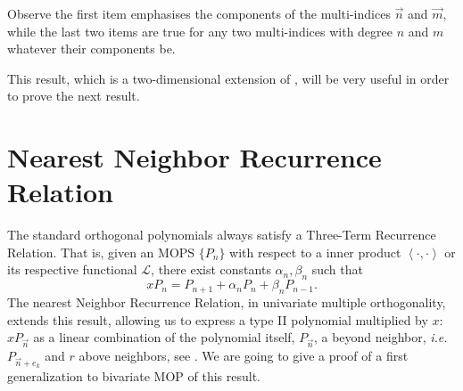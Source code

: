 \documentclass[12pt,a4]{article}
\theoremstyle{plain}
\newcommand{\prodesc}[2]{\left\langle #1 , #2 \right\rangle}
\begin{document}
Observe the first item emphasises the components of the multi-indices $\vec n$ and $\vec m$, while the last two items are true for any two multi-indices with degree $n$ and $m$ whatever their components be.

This result, which is a two-dimensional extension of \cite[Theorem 23.1.6]{Ismail}, will be very useful in order to prove the next result.

\section{Nearest Neighbor Recurrence Relation}

The standard orthogonal polynomials always satisfy a Three-Term Recurrence Relation. That is, given an MOPS $\{P_n\}$ with respect to a inner product $\prodesc{\cdot}{\cdot}$ or its respective functional $\mathcal L$, there exist constants $\alpha_n,\beta_n$ such that
$$
xP_n = P_{n+1}+ \alpha_n P_n + \beta_n P_{n-1}.
$$
The nearest Neighbor Recurrence Relation, in univariate multiple orthogonality, extends this result, allowing us to express a type II polynomial multiplied by $x$: $xP_{\vec n}$ as a linear combination of the polynomial itself, $P_{\vec n}$, a beyond neighbor, \textit{i.e.} $P_{\vec n + e_k}$ and $r$ above neighbors, see \cite[Theorem 23.1.7]{Ismail}. We are going to give a proof of a first generalization to bivariate MOP of this result. 
\end{document}
